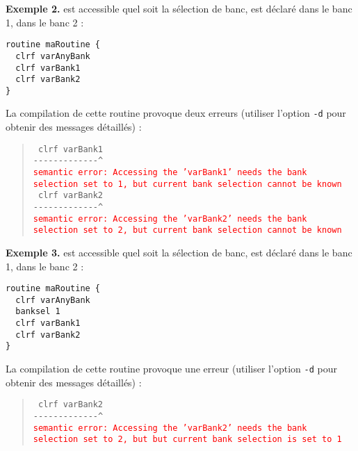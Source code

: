 \textbf{Exemple 2.}  est accessible quel soit la sélection de banc,  est déclaré dans le banc 1,  dans le banc 2 :
\begin{lstlisting}[language=piccolo]
routine maRoutine {
  clrf varAnyBank
  clrf varBank1
  clrf varBank2
}
\end{lstlisting}

La compilation de cette routine provoque deux erreurs (utiliser l’option \texttt{-d} pour obtenir des messages détaillés) :

\begin{quote}
\texttt{  clrf varBank1}\\
\texttt{-{-}-{-}-{-}-{-}-{-}-{-}-\^{}}\\
\textcolor{red}{\tt semantic error: Accessing the 'varBank1' needs the bank selection set to 1, but current bank selection cannot be known}\\

\texttt{  clrf varBank2}\\
\texttt{-{-}-{-}-{-}-{-}-{-}-{-}-\^}\\
\textcolor{red}{\tt semantic error: Accessing the 'varBank2' needs the bank selection set to 2, but current bank selection cannot be known}
\end{quote}




\textbf{Exemple 3.}  est accessible quel soit la sélection de banc,  est déclaré dans le banc 1,  dans le banc 2 :
\begin{lstlisting}[language=piccolo]
routine maRoutine {
  clrf varAnyBank
  banksel 1
  clrf varBank1
  clrf varBank2
}
\end{lstlisting}

La compilation de cette routine provoque une erreur (utiliser l’option \texttt{-d} pour obtenir des messages détaillés) :

\begin{quote}
\texttt{  clrf varBank2}\\
\texttt{-{-}-{-}-{-}-{-}-{-}-{-}-\^}\\
\textcolor{red}{\tt semantic error: Accessing the 'varBank2' needs the bank selection set to 2, but but current bank selection is set to 1}
\end{quote}













